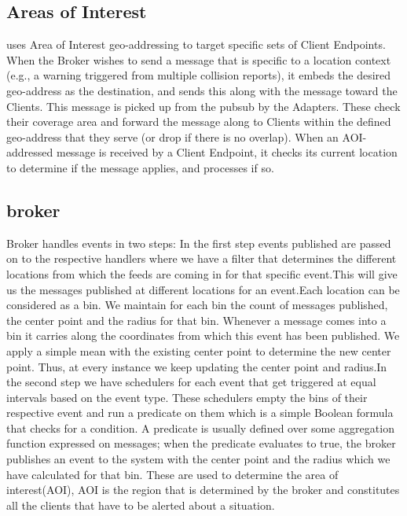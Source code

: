 \subsection{Areas of Interest}
\label{sec:aoi}

\name{} uses Area of Interest geo-addressing to target specific sets
of Client Endpoints.  When the Broker wishes to send a message that is
specific to a location context (e.g., a warning triggered from
multiple collision reports), it embeds the desired geo-address as the
destination, and sends this along with the message toward the
Clients. This message is picked up from the pubsub by the Adapters.
These check their coverage area and forward the message along to
Clients within the defined geo-address that they serve (or drop if
there is no overlap).  When an AOI-addressed message is received by a
Client Endpoint, it checks its current location to determine if the
message applies, and processes if so.

\subsection{\name{} broker}
  
\name{} Broker handles events in two steps: In the first step events
published are passed on to the respective handlers where we have a
filter that determines the different locations from which the feeds
are coming in for that specific event.This will give us the messages
published at different locations for an event.Each location can be
considered as a bin. We maintain for each bin the count of messages
published, the center point and the radius for that bin.  Whenever a
message comes into a bin it carries along the coordinates from which
this event has been published. We apply a simple mean with the
existing center point to determine the new center point. Thus, at
every instance we keep updating the center point and radius.In the
second step we have schedulers for each event that get triggered at
equal intervals based on the event type.  These schedulers empty the
bins of their respective event and run a predicate on them which is a
simple Boolean formula that checks for a condition.  A predicate is
usually defined over some aggregation function expressed on messages;
when the predicate evaluates to true, the \name{} broker publishes an
event to the system with the center point and the radius which we have
calculated for that bin. These are used to determine the area of
interest(AOI), AOI is the region that is determined by the \name{} broker
and constitutes all the clients that have to be alerted about a
situation.

